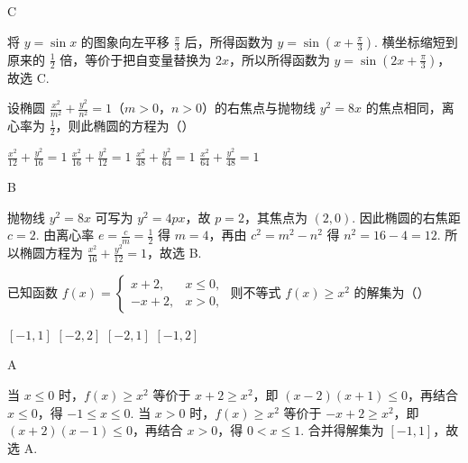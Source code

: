 \begin{answer}
C
\end{answer}

\begin{solution}
将 \(y=\sin x\) 的图象向左平移 \(\frac{\pi}{3}\) 后，所得函数为 \(y=\sin\left(x+\frac{\pi}{3}\right)\). 横坐标缩短到原来的 \(\frac{1}{2}\) 倍，等价于把自变量替换为 \(2x\)，所以所得函数为
\(y=\sin\left(2x+\frac{\pi}{3}\right)\)，故选 C.
\end{solution}

\begin{problem}
设椭圆 \(\frac{x^2}{m^2} + \frac{y^2}{n^2} = 1\)（\(m > 0\)，\(n > 0\)）的右焦点与抛物线 \(y^2 = 8x\) 的焦点相同，离心率为 \(\frac{1}{2}\)，则此椭圆的方程为（\quad）

\choices
    {\(\frac{x^2}{12} +\frac{y^2}{16} = 1\)}
    {\(\frac{x^2}{16} +\frac{y^2}{12} = 1\)}
    {\(\frac{x^2}{48} +\frac{y^2}{64} = 1\)}
    {\(\frac{x^2}{64} +\frac{y^2}{48} = 1\)}
\end{problem}

\begin{answer}
B
\end{answer}

\begin{solution}
抛物线 \(y^2=8x\) 可写为 \(y^2=4px\)，故 \(p=2\)，其焦点为 \((2,0)\). 因此椭圆的右焦距 \(c=2\). 由离心率 \(e=\frac{c}{m}=\frac{1}{2}\) 得 \(m=4\)，再由 \(c^2=m^2-n^2\) 得 \(n^2=16-4=12\). 所以椭圆方程为 \(\frac{x^2}{16}+\frac{y^2}{12}=1\)，故选 B.
\end{solution}

\begin{problem}
已知函数 \( f(x) = \begin{cases}
x + 2, & x \leqslant 0,\\
-x + 2, & x > 0,
\end{cases} \) 则不等式 \( f(x) \geqslant x^2 \) 的解集为（\quad）

\choices
    {\([-1, 1]\)}
    {\([-2, 2]\)}
    {\([-2, 1]\)}
    {\([-1, 2]\)}
\end{problem}

\begin{answer}
A
\end{answer}

\begin{solution}
当 \(x\leqslant0\) 时，\(f(x)\geqslant x^2\) 等价于
\(x+2\geqslant x^2\)，即 \((x-2)(x+1)\leqslant0\)，再结合 \(x\leqslant0\)，得 \(-1\leqslant x\leqslant0\).
当 \(x>0\) 时，\(f(x)\geqslant x^2\) 等价于 \(-x+2\geqslant x^2\)，即 \((x+2)(x-1)\leqslant0\)，再结合 \(x>0\)，得 \(0<x\leqslant1\). 合并得解集为 \([-1,1]\)，故选 A.
\end{solution}

